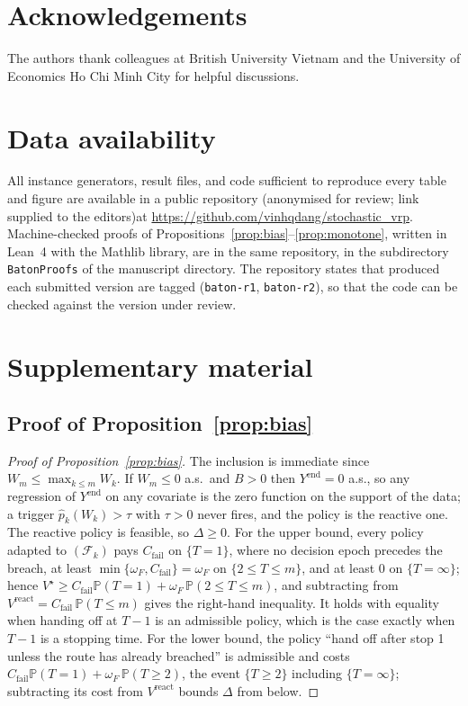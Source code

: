 \documentclass[preprint,authoryear,12pt]{elsarticle}
\theoremstyle{definition}
\theoremstyle{remark}
\begin{document}
\ifanon\else
\section*{Acknowledgements}
The authors thank colleagues at British University Vietnam and the
University of Economics Ho Chi Minh City for helpful
discussions.
\fi

\section*{Data availability}
All instance generators, result files, and code sufficient to reproduce
every table and figure are available in a public repository
\ifanon (anonymised for review; link supplied to the editors)\else at
\url{https://github.com/vinhqdang/stochastic_vrp}\fi.
Machine-checked proofs of Propositions~\ref{prop:bias}--\ref{prop:monotone},
written in Lean~4 with the Mathlib library, are in the same repository,
in the subdirectory \nolinkurl{BatonProofs} of the manuscript directory.
The repository states that produced each submitted version are tagged
(\nolinkurl{baton-r1}, \nolinkurl{baton-r2}), so that the code can be
checked against the version under review.

\appendix

\section{Supplementary material}\label{app:supp}
\setcounter{table}{0}
\setcounter{figure}{0}

\subsection{Proof of Proposition~\ref{prop:bias}}\label{app:proofbias}

\begin{proof}[Proof of Proposition~\ref{prop:bias}]
The inclusion is immediate since $W_m \le \max_{k\le m} W_k$. If
$W_m \le 0$ a.s.\ and $B > 0$ then $Y^{\mathrm{end}} = 0$ a.s., so any
regression of $Y^{\mathrm{end}}$ on any covariate is the zero function
on the support of the data; a trigger $\hat p_k(W_k) > \tau$ with
$\tau > 0$ never fires, and the policy is the reactive one. The reactive
policy is feasible, so $\Delta \ge 0$. For the upper bound, every
policy adapted to $(\mathcal F_k)$ pays $C_{\mathrm{fail}}$ on
$\{T = 1\}$, where no decision epoch precedes the breach, at least
$\min\{\omega_F, C_{\mathrm{fail}}\} = \omega_F$ on
$\{2 \le T \le m\}$, and at least $0$ on $\{T = \infty\}$; hence
$V^\star \ge C_{\mathrm{fail}}\mathbb P(T{=}1) +
\omega_F\,\mathbb P(2 \le T \le m)$, and subtracting from
$V^{\mathrm{react}} = C_{\mathrm{fail}}\,\mathbb P(T \le m)$ gives the
right-hand inequality. It holds with equality when handing off at $T-1$
is an admissible policy, which is the case exactly when $T-1$ is a
stopping time. For the lower bound, the policy ``hand off after stop 1
unless the route has already breached'' is admissible and costs
$C_{\mathrm{fail}}\mathbb P(T{=}1) + \omega_F\,\mathbb P(T \ge 2)$, the
event $\{T \ge 2\}$ including $\{T = \infty\}$; subtracting its cost
from $V^{\mathrm{react}}$ bounds $\Delta$ from below.
\end{proof}
\end{document}
